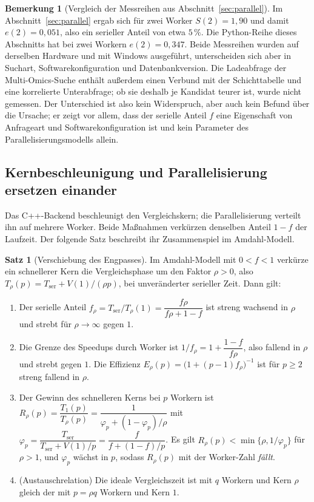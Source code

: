 \documentclass[a4paper,12pt, twoside]{report}
\theoremstyle{definition}
\newtheorem{satz}{Satz}
\newtheorem{bemerkung}{Bemerkung}
\begin{document}
\begin{bemerkung}[Vergleich der Messreihen aus Abschnitt~\ref{sec:parallel}]
\label{bem:p910_vergleich7}
Im Abschnitt~\ref{sec:parallel} ergab sich für zwei Worker $S(2)=1{,}90$ und damit $e(2)=0{,}051$, also ein serieller Anteil von etwa $5\,\%$. Die Python-Reihe dieses Abschnitts hat bei zwei Workern $e(2)=0{,}347$. Beide Messreihen wurden auf derselben Hardware und mit Windows ausgeführt, unterscheiden sich aber in Suchart, Softwarekonfiguration und Datenbankversion. Die Ladeabfrage der Multi-Omics-Suche enthält außerdem einen Verbund mit der Schichttabelle und eine korrelierte Unterabfrage; ob sie deshalb je Kandidat teurer ist, wurde nicht gemessen. Der Unterschied ist also kein Widerspruch, aber auch kein Befund über die Ursache; er zeigt vor allem, dass der serielle Anteil $f$ eine Eigenschaft von Anfrageart und Softwarekonfiguration ist und kein Parameter des Parallelisierungsmodells allein.
\end{bemerkung}

\subsection{Kernbeschleunigung und Parallelisierung ersetzen einander}
\label{sec:p910_kern}

Das C++-Backend beschleunigt den Vergleichskern; die Parallelisierung verteilt ihn auf mehrere Worker. Beide Maßnahmen verkürzen denselben Anteil $1-f$ der Laufzeit. Der folgende Satz beschreibt ihr Zusammenspiel im Amdahl-Modell.

\begin{satz}[Verschiebung des Engpasses]
\label{satz:p910_engpass}
Im Amdahl-Modell mit $0<f<1$ verkürze ein schnellerer Kern die Vergleichsphase um den Faktor $\rho>0$, also $T_\rho(p)=T_{\mathrm{ser}}+V(1)/(\rho p)$, bei unveränderter serieller Zeit. Dann gilt:
\begin{enumerate}[label=(\alph*)]
\item Der serielle Anteil $f_\rho=T_{\mathrm{ser}}/T_\rho(1)=\dfrac{f\rho}{f\rho+1-f}$ ist streng wachsend in $\rho$ und strebt für $\rho\to\infty$ gegen $1$.
\item Die Grenze des Speedups durch Worker ist $1/f_\rho=1+\dfrac{1-f}{f\rho}$, also fallend in $\rho$ und strebt gegen $1$. Die Effizienz $E_\rho(p)=\bigl(1+(p-1)f_\rho\bigr)^{-1}$ ist für $p\ge 2$ streng fallend in $\rho$.
\item Der Gewinn des schnelleren Kerns bei $p$ Workern ist $R_\rho(p)=\dfrac{T_1(p)}{T_\rho(p)}=\dfrac{1}{\varphi_p+(1-\varphi_p)/\rho}$ mit $\varphi_p=\dfrac{T_{\mathrm{ser}}}{T_{\mathrm{ser}}+V(1)/p}=\dfrac{f}{f+(1-f)/p}$. Es gilt $R_\rho(p)<\min\{\rho,1/\varphi_p\}$ für $\rho>1$, und $\varphi_p$ wächst in $p$, sodass $R_\rho(p)$ mit der Worker-Zahl \emph{fällt}.
\item (Austauschrelation) Die ideale Vergleichszeit ist mit $q$ Workern und Kern $\rho$ gleich der mit $p=\rho q$ Workern und Kern $1$.
\end{enumerate}
\end{satz}
\end{document}
